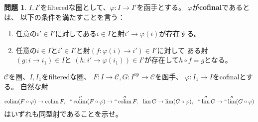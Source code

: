 \documentclass[uplatex,dvipdfmx]{jsarticle}
\theoremstyle{definition}
\newtheorem{prob}[prob]{問題}
\newcommand{\op}{\mathrm{op}}
\DeclareMathOperator{\colim}{\mathrm{colim}}
\newcommand\mcC{\mathcal{C}}
\begin{document}
\begin{prob}\label{1.38}
  \(I,I'\)をfilteredな圏として、\(\varphi:I\to I'\)を函手とする。
  \(\varphi\)が\textbf{cofinal}であるとは、
  以下の条件を満たすことを言う：
  \begin{enumerate}
    \item
    任意の\(i'\in I'\)に対してある\(i\in I\)と射\(i'\to \varphi(i)\)が存在する。
    \item
    任意の\(i\in I\)と\(i'\in I'\)と射\((f:\varphi(i)\to i')\in I'\)に対して
    ある射\((g:i\to i_1)\in I\)と
    \((h:i'\to \varphi(i_1))\in I'\)が存在して\(h\circ f = g\)となる。
  \end{enumerate}
  \(\mcC\)を圏、\(I,I_1\)をfilteredな圏、
  \(F:I\to \mcC, G:I^{\op}\to \mcC\)を函手、
  \(\varphi:I_1\to I\)をcofinalとする。
  自然な射
  \[
  \colim (F\circ \varphi) \to \colim F, \ \
  ``\colim'' (F\circ \varphi) \to ``\colim'' F, \ \
  \lim G \to \lim (G\circ \varphi), \ \
  ``\lim'' G \to ``\lim'' (G\circ \varphi)
  \]
  はいずれも同型射であることを示せ。
\end{prob}
\end{document}
